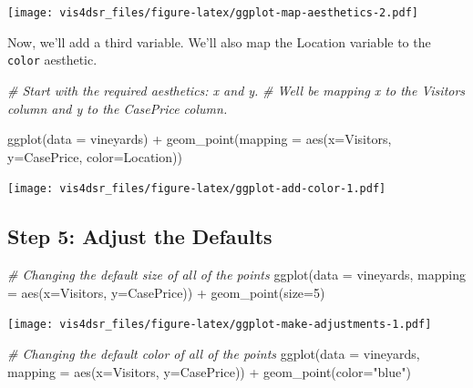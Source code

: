 \documentclass[
]{krantz}
\makeatletter
\newenvironment{Shaded}{\begin{snugshade}}{\end{snugshade}}
\newcommand{\AttributeTok}[1]{\textcolor[rgb]{0.61,0.61,0.61}{#1}}
\newcommand{\CommentTok}[1]{\textcolor[rgb]{0.37,0.37,0.37}{\textit{#1}}}
\newcommand{\DecValTok}[1]{\textcolor[rgb]{0.06,0.06,0.06}{#1}}
\newcommand{\FunctionTok}[1]{\textcolor[rgb]{0,0,0}{#1}}
\newcommand{\NormalTok}[1]{#1}
\newcommand{\SpecialCharTok}[1]{\textcolor[rgb]{0,0,0}{#1}}
\newcommand{\StringTok}[1]{\textcolor[rgb]{0.5,0.5,0.5}{#1}}
\newenvironment{kframe}{%
\medskip{}
\setlength{\fboxsep}{.8em}
 \def\at@end@of@kframe{}%
 \ifinner\ifhmode%
  \def\at@end@of@kframe{\end{minipage}}%
  \begin{minipage}{\columnwidth}%
 \fi\fi%
 \def\FrameCommand##1{\hskip\@totalleftmargin \hskip-\fboxsep
 \colorbox{shadecolor}{##1}\hskip-\fboxsep
     \hskip-\linewidth \hskip-\@totalleftmargin \hskip\columnwidth}%
 \MakeFramed {\advance\hsize-\width
   \@totalleftmargin\z@ \linewidth\hsize
   \@setminipage}}%
 {\par\unskip\endMakeFramed%
 \at@end@of@kframe}
\renewenvironment{Shaded}{\begin{kframe}}{\end{kframe}}
\makeatother
\begin{document}
\texttt{[image: vis4dsr\_files/figure-latex/ggplot-map-aesthetics-2.pdf]}

Now, we'll add a third variable. We'll also map the Location variable to the \texttt{color} aesthetic.

\begin{Shaded}
\begin{Highlighting}[]
\CommentTok{\# Start with the required aesthetics: x and y.}
\CommentTok{\# We\textquotesingle{}ll be mapping x to the Visitors column and y to the CasePrice column.}

\FunctionTok{ggplot}\NormalTok{(}\AttributeTok{data =}\NormalTok{ vineyards) }\SpecialCharTok{+}
  \FunctionTok{geom\_point}\NormalTok{(}\AttributeTok{mapping =} \FunctionTok{aes}\NormalTok{(}\AttributeTok{x=}\NormalTok{Visitors, }\AttributeTok{y=}\NormalTok{CasePrice, }\AttributeTok{color=}\NormalTok{Location))}
\end{Highlighting}
\end{Shaded}

\texttt{[image: vis4dsr\_files/figure-latex/ggplot-add-color-1.pdf]}

\hypertarget{step-5-adjust-the-defaults}{%
\subsection{Step 5: Adjust the Defaults}\label{step-5-adjust-the-defaults}}

\begin{Shaded}
\begin{Highlighting}[]
\CommentTok{\# Changing the default size of all of the points}
\FunctionTok{ggplot}\NormalTok{(}\AttributeTok{data =}\NormalTok{ vineyards, }\AttributeTok{mapping =} \FunctionTok{aes}\NormalTok{(}\AttributeTok{x=}\NormalTok{Visitors, }\AttributeTok{y=}\NormalTok{CasePrice)) }\SpecialCharTok{+}
  \FunctionTok{geom\_point}\NormalTok{(}\AttributeTok{size=}\DecValTok{5}\NormalTok{)}
\end{Highlighting}
\end{Shaded}

\texttt{[image: vis4dsr\_files/figure-latex/ggplot-make-adjustments-1.pdf]}

\begin{Shaded}
\begin{Highlighting}[]
\CommentTok{\# Changing the default color of all of the points}
\FunctionTok{ggplot}\NormalTok{(}\AttributeTok{data =}\NormalTok{ vineyards, }\AttributeTok{mapping =} \FunctionTok{aes}\NormalTok{(}\AttributeTok{x=}\NormalTok{Visitors, }\AttributeTok{y=}\NormalTok{CasePrice)) }\SpecialCharTok{+}
  \FunctionTok{geom\_point}\NormalTok{(}\AttributeTok{color=}\StringTok{"blue"}\NormalTok{)}
\end{Highlighting}
\end{Shaded}
\end{document}
